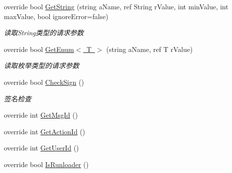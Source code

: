 \begin{DoxyCompactItemize}
override bool \mbox{\hyperlink{class_t_net_1_1_contract_1_1_http_get_a7f5bba3c6d5f753e751e3985ff95e4c7}{Get\+String}} (string a\+Name, ref String r\+Value, int min\+Value, int max\+Value, bool ignore\+Error=false)
\begin{DoxyCompactList}\small\item\em 读取\+String类型的请求参数 \end{DoxyCompactList}\item 
override bool \mbox{\hyperlink{class_t_net_1_1_contract_1_1_http_get_aa2cbfe47248fe3d1abce83bf71d2f383}{Get\+Enum$<$ T $>$}} (string a\+Name, ref T r\+Value)
\begin{DoxyCompactList}\small\item\em 读取枚举类型的请求参数 \end{DoxyCompactList}\item 
override bool \mbox{\hyperlink{class_t_net_1_1_contract_1_1_http_get_a7efaceab7af2c1cb106ac7ecb509bced}{Check\+Sign}} ()
\begin{DoxyCompactList}\small\item\em 签名检查 \end{DoxyCompactList}\item 
override int \mbox{\hyperlink{class_t_net_1_1_contract_1_1_http_get_a2e0ab50edf56ff86cb8d4c1ed1543f38}{Get\+Msg\+Id}} ()
\item 
override int \mbox{\hyperlink{class_t_net_1_1_contract_1_1_http_get_aa0a8d94ffac5ba1d1ccd91b04727410c}{Get\+Action\+Id}} ()
\item 
override int \mbox{\hyperlink{class_t_net_1_1_contract_1_1_http_get_a7b5dc9b46cf6f1536977fcd46e63dbb1}{Get\+User\+Id}} ()
\item 
override bool \mbox{\hyperlink{class_t_net_1_1_contract_1_1_http_get_aaa9bfb4336c9669f730263defee0176f}{Is\+Runloader}} ()
\end{DoxyCompactItemize}
